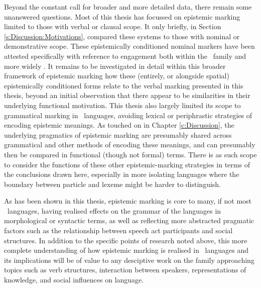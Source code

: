 Beyond the constant call for broader and more detailed data, there remain some unanswered questions. Most of this thesis has focussed on epistemic marking limited to those with verbal or clausal scope. It only briefly, in Section \ref{s:Discussion:Motivations}, compared these systems to those with nominal or demonstrative scope. These epistemically conditioned nominal markers have been attested specifically with reference to engagement both within the \lfam\ family \cite{GonzalezPerez2022} and more widely \cites{EvansBergqvistSanRoque2018a}{EvansBergqvistSanRoque2018b}. It remains to be investigated in detail within this broader framework of epistemic marking how these (entirely, or alongside spatial) epistemically conditioned forms relate to the verbal marking presented in this thesis, beyond an initial observation that there appear to be similarities in their underlying functional motivation. This thesis also largely limited its scope to grammatical marking in \lfam\ languages, avoiding lexical or periphrastic strategies of encoding epistemic meanings. As touched on in Chapter \ref{c:Discussion}, the underlying pragmatics of epistemic marking are presumably shared across grammatical and other methods of encoding these meanings, and can presumably then be compared in functional (though not formal) terms. There is as such scope to consider the functions of these other epistemic-marking strategies in terms of the conclusions drawn here, especially in more isolating languages where the boundary between particle and lexeme might be harder to distinguish.

As has been shown in this thesis, epistemic marking is core to many, if not most \lfam\ languages, having realised effects on the grammar of the languages in morphological or syntactic terms, as well as reflecting more abstracted pragmatic factors such as the relationship between speech act participants and social structures. In addition to the specific points of research noted above, this more complete understanding of how epistemic marking is realised in \lfam\ languages and its implications will be of value to any desciptive work on the family approaching topics such as verb structures, interaction between speakers, representations of knowledge, and social influences on language.
